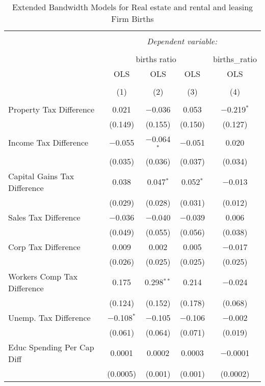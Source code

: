 
\begin{table}[!htbp] \centering 
  \caption{Extended Bandwidth Models for  Real estate and rental and leasing Firm Births} 
  \label{53eb} 
\begin{tabular}{@{\extracolsep{5pt}}lcccc} 
\\[-1.8ex]\hline 
\hline \\[-1.8ex] 
 & \multicolumn{4}{c}{\textit{Dependent variable:}} \\ 
\cline{2-5} 
\\[-1.8ex] & \multicolumn{3}{c}{births ratio} & births\_ratio \\ 
 & OLS & OLS & OLS & OLS \\ 
\\[-1.8ex] & (1) & (2) & (3) & (4)\\ 
\hline \\[-1.8ex] 
 Property Tax Difference & 0.021 & $-$0.036 & 0.053 & $-$0.219$^{*}$ \\ 
  & (0.149) & (0.155) & (0.150) & (0.127) \\ 
  Income Tax Difference & $-$0.055 & $-$0.064$^{*}$ & $-$0.051 & 0.020 \\ 
  & (0.035) & (0.036) & (0.037) & (0.034) \\ 
  Capital Gains Tax Difference & 0.038 & 0.047$^{*}$ & 0.052$^{*}$ & $-$0.013 \\ 
  & (0.029) & (0.028) & (0.031) & (0.012) \\ 
  Sales Tax Difference & $-$0.036 & $-$0.040 & $-$0.039 & 0.006 \\ 
  & (0.049) & (0.055) & (0.056) & (0.038) \\ 
  Corp Tax Difference & 0.009 & 0.002 & 0.005 & $-$0.017 \\ 
  & (0.026) & (0.025) & (0.025) & (0.025) \\ 
  Workers Comp Tax Difference & 0.175 & 0.298$^{**}$ & 0.214 & $-$0.024 \\ 
  & (0.124) & (0.152) & (0.178) & (0.068) \\ 
  Unemp. Tax Difference & $-$0.108$^{*}$ & $-$0.105 & $-$0.106 & $-$0.002 \\ 
  & (0.061) & (0.064) & (0.071) & (0.019) \\ 
  Educ Spending Per Cap Diff & 0.0001 & 0.0002 & 0.0003 & $-$0.0001 \\ 
  & (0.0005) & (0.001) & (0.001) & (0.0002) \\ 

\end{tabular}
\end{table}
